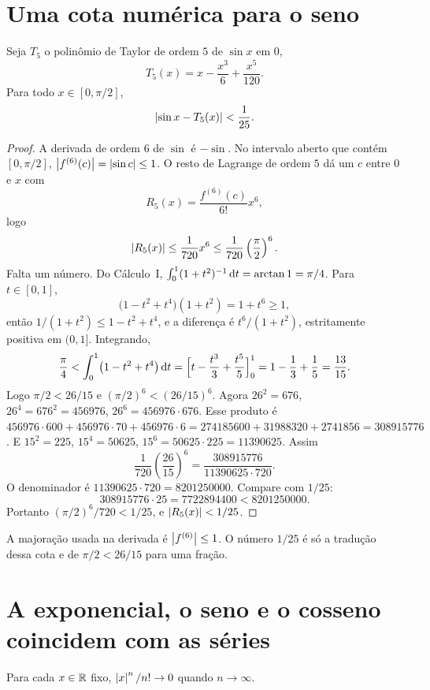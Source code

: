 \documentclass[11pt,a4paper]{article}
\begin{document}
\section{Uma cota numérica para o seno}

\begin{teorema}
Seja \(T_5\) o polinômio de Taylor de ordem \(5\) de \(\sin x\) em \(0\),
\[
T_5(x)=x-\frac{x^3}{6}+\frac{x^5}{120}.
\]
Para todo \(x\in[0,\pi/2]\),
\[
\left\lvert \sin x-T_5(x) \right\rvert<\frac{1}{25}.
\]
\end{teorema}

\begin{proof}
A derivada de ordem \(6\) de \(\sin\) é \(-\sin\). No intervalo aberto que contém \([0,\pi/2]\), \(\left\lvert f^{(6)}(c) \right\rvert=\left\lvert \sin c \right\rvert\le 1\). O resto de Lagrange de ordem \(5\) dá um \(c\) entre \(0\) e \(x\) com
\[
R_5(x)=\frac{f^{(6)}(c)}{6!}x^6,
\]
logo
\[
\left\lvert R_5(x) \right\rvert\le\frac{1}{720}x^6\le\frac{1}{720}\left(\frac{\pi}{2}\right)^6.
\]
Falta um número. Do Cálculo~I, \(\int_0^1 (1+t^2)^{-1}\,\mathrm{d} t=\arctan 1=\pi/4\). Para \(t\in[0,1]\),
\[
\bigl(1-t^2+t^4\bigr)(1+t^2)=1+t^6\ge 1,
\]
então \(1/(1+t^2)\le 1-t^2+t^4\), e a diferença é \(t^6/(1+t^2)\), estritamente positiva em \((0,1]\). Integrando,
\[
\frac{\pi}{4}<\int_0^1\bigl(1-t^2+t^4\bigr)\,\mathrm{d} t=\Bigl[t-\frac{t^3}{3}+\frac{t^5}{5}\Bigr]_0^1=1-\frac{1}{3}+\frac{1}{5}=\frac{13}{15}.
\]
Logo \(\pi/2<26/15\) e \((\pi/2)^6<(26/15)^6\). Agora \(26^2=676\), \(26^4=676^2=456976\), \(26^6=456976\cdot 676\). Esse produto é \(456976\cdot 600+456976\cdot 70+456976\cdot 6=274185600+31988320+2741856=308915776\). E \(15^2=225\), \(15^4=50625\), \(15^6=50625\cdot 225=11390625\). Assim
\[
\frac{1}{720}\left(\frac{26}{15}\right)^6=\frac{308915776}{11390625\cdot 720}.
\]
O denominador é \(11390625\cdot 720=8201250000\). Compare com \(1/25\):
\[
308915776\cdot 25=7722894400<8201250000.
\]
Portanto \((\pi/2)^6/720<1/25\), e \(\left\lvert R_5(x) \right\rvert<1/25\).
\end{proof}

A majoração usada na derivada é \(\left\lvert f^{(6)} \right\rvert\le 1\). O número \(1/25\) é só a tradução dessa cota e de \(\pi/2<26/15\) para uma fração.

\section{A exponencial, o seno e o cosseno coincidem com as séries}

\begin{lema}
\label{lem:fatorial}
Para cada \(x\in\mathbb{R}\) fixo, \(\left\lvert x \right\rvert^{n}/n!\to 0\) quando \(n\to\infty\).
\end{lema}
\end{document}
